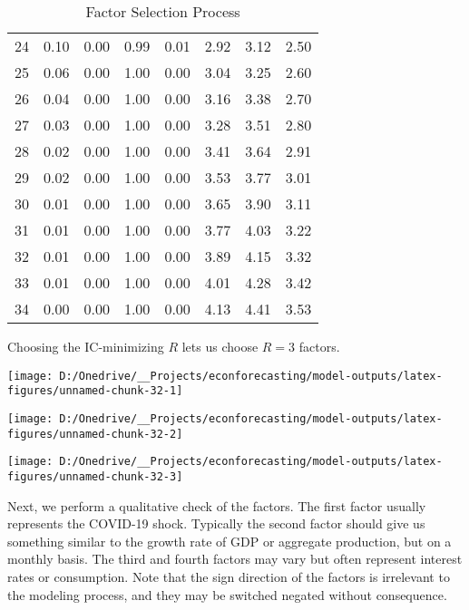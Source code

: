 \documentclass[11pt, letterpaper]{article}\usepackage[]{graphicx}\usepackage[]{color}
\begin{document}
\begin{table}[H]
\begin{tabular}{cccccccc}
   24 & 0.10 & 0.00 & 0.99 & 0.01 & 2.92 & 3.12 & 2.50 \\ 
   25 & 0.06 & 0.00 & 1.00 & 0.00 & 3.04 & 3.25 & 2.60 \\ 
   26 & 0.04 & 0.00 & 1.00 & 0.00 & 3.16 & 3.38 & 2.70 \\ 
   27 & 0.03 & 0.00 & 1.00 & 0.00 & 3.28 & 3.51 & 2.80 \\ 
   28 & 0.02 & 0.00 & 1.00 & 0.00 & 3.41 & 3.64 & 2.91 \\ 
   29 & 0.02 & 0.00 & 1.00 & 0.00 & 3.53 & 3.77 & 3.01 \\ 
   30 & 0.01 & 0.00 & 1.00 & 0.00 & 3.65 & 3.90 & 3.11 \\ 
   31 & 0.01 & 0.00 & 1.00 & 0.00 & 3.77 & 4.03 & 3.22 \\ 
   32 & 0.01 & 0.00 & 1.00 & 0.00 & 3.89 & 4.15 & 3.32 \\ 
   33 & 0.01 & 0.00 & 1.00 & 0.00 & 4.01 & 4.28 & 3.42 \\ 
   34 & 0.00 & 0.00 & 1.00 & 0.00 & 4.13 & 4.41 & 3.53 \\ 
   \hline
\end{tabular}
\endgroup
\caption{Factor Selection Process} 
\end{table}


Choosing the IC-minimizing $R$ lets us choose $R = 3$ factors.



{\centering \texttt{[image: D:/Onedrive/\_\_Projects/econforecasting/model-outputs/latex-figures/unnamed-chunk-32-1]} 

}




{\centering \texttt{[image: D:/Onedrive/\_\_Projects/econforecasting/model-outputs/latex-figures/unnamed-chunk-32-2]} 

}




{\centering \texttt{[image: D:/Onedrive/\_\_Projects/econforecasting/model-outputs/latex-figures/unnamed-chunk-32-3]} 

}




Next, we perform a qualitative check of the factors. The first factor usually represents the COVID-19 shock. Typically the second factor should give us something similar to the growth rate of GDP or aggregate production, but on a monthly basis. The third and fourth factors may vary but often represent interest rates or consumption. Note that the sign direction of the factors is irrelevant to the modeling process, and they may be switched negated without consequence. 
\end{document}
